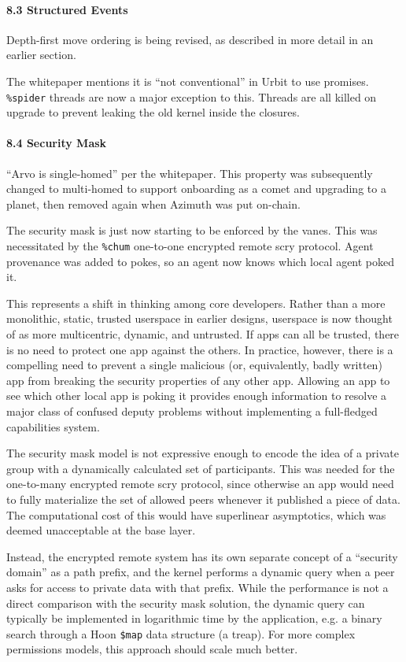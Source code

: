\documentclass[twoside]{article}
\begin{document}
\paragraph{8.3 Structured Events}  Depth-first move ordering is being revised, as described in more detail in an earlier section.

The whitepaper mentions it is ``not conventional'' in Urbit to use promises.  \lstinline[style=inlinecode]{%spider} threads are now a major exception to this.  Threads are all killed on upgrade to prevent leaking the old kernel inside the closures.

\paragraph{8.4 Security Mask}  ``Arvo is single-homed'' per the whitepaper.  This property was subsequently changed to multi-homed to support onboarding as a comet and upgrading to a planet, then removed again when Azimuth was put on-chain.

The security mask is just now starting to be enforced by the vanes.  This was necessitated by the \lstinline[style=inlinecode]{%chum} one-to-one encrypted remote scry protocol.  Agent provenance was added to pokes, so an agent now knows which local agent poked it.

This represents a shift in thinking among core developers.  Rather than a more monolithic, static, trusted userspace in earlier designs, userspace is now thought of as more multicentric, dynamic, and untrusted.  If apps can all be trusted, there is no need to protect one app against the others.  In practice, however, there is a compelling need to prevent a single malicious (or, equivalently, badly written) app from breaking the security properties of any other app.  Allowing an app to see which other local app is poking it provides enough information to resolve a major class of confused deputy problems without implementing a full-fledged capabilities system.

The security mask model is not expressive enough to encode the idea of a private group with a dynamically calculated set of participants.  This was needed for the one-to-many encrypted remote scry protocol, since otherwise an app would need to fully materialize the set of allowed peers whenever it published a piece of data.  The computational cost of this would have superlinear asymptotics, which was deemed unacceptable at the base layer.

Instead, the encrypted remote system has its own separate concept of a ``security domain'' as a path prefix, and the kernel performs a dynamic query when a peer asks for access to private data with that prefix.  While the performance is not a direct comparison with the security mask solution, the dynamic query can typically be implemented in logarithmic time by the application, e.g. a binary search through a Hoon \lstinline[style=inlinecode]{$map} data structure (a treap).  For more complex permissions models, this approach should scale much better.
\end{document}
